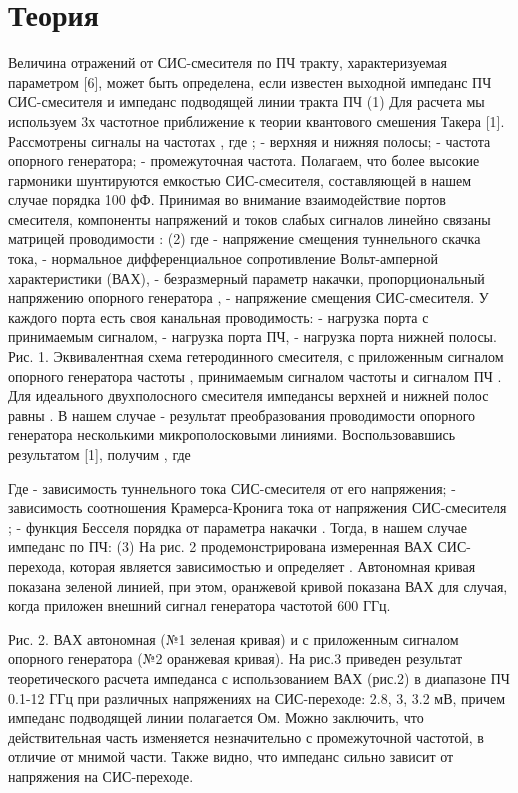 \documentclass[a4paper]{article}
\begin{document}
\section{Теория}

Величина отражений от СИС-смесителя по ПЧ тракту, характеризуемая параметром  [6], может быть определена, если известен выходной импеданс ПЧ СИС-смесителя  и импеданс подводящей линии тракта ПЧ 	(1)
Для расчета  мы используем 3х частотное приближение к теории квантового смешения Такера [1].  Рассмотрены сигналы на частотах  , где ;  - верхняя и нижняя полосы;  - частота опорного генератора;  - промежуточная частота. Полагаем, что более высокие гармоники шунтируются емкостью СИС-смесителя, составляющей в нашем случае порядка 100 фФ.
Принимая во внимание взаимодействие портов смесителя, компоненты напряжений и токов слабых сигналов линейно связаны матрицей проводимости  :
	(2)
где  - напряжение смещения туннельного скачка тока,  - нормальное дифференциальное сопротивление Вольт-амперной характеристики (ВАХ),  - безразмерный параметр накачки, пропорциональный напряжению опорного генератора  ,  - напряжение смещения СИС-смесителя. 
У каждого порта есть своя канальная проводимость:  - нагрузка порта с принимаемым сигналом,  - нагрузка порта ПЧ,  - нагрузка порта нижней полосы.
Рис. 1. Эквивалентная схема гетеродинного смесителя, с приложенным сигналом опорного генератора частоты , принимаемым сигналом частоты  и сигналом ПЧ  .
Для  идеального двухполосного  смесителя  импедансы верхней и нижней полос равны . В нашем случае  - результат преобразования проводимости  опорного генератора несколькими микрополосковыми линиями.
Воспользовавшись результатом [1], получим  , где


Где  - зависимость туннельного  тока СИС-смесителя от его напряжения;  - зависимость соотношения Крамерса-Кронига тока  от напряжения СИС-смесителя ;  - функция Бесселя порядка  от параметра накачки  .
Тогда, в нашем случае импеданс по ПЧ:
	(3)
На рис. 2 продемонстрирована измеренная ВАХ СИС-перехода, которая является  зависимостью и определяет . Автономная кривая показана зеленой линией, при этом, оранжевой кривой показана ВАХ для случая, когда приложен внешний сигнал генератора частотой 600 ГГц. 

Рис. 2. ВАХ автономная (№1 зеленая кривая) и с приложенным сигналом опорного генератора (№2 оранжевая кривая).
На рис.3 приведен результат теоретического расчета импеданса с использованием ВАХ (рис.2) в диапазоне ПЧ 0.1-12 ГГц при различных напряжениях на СИС-переходе: 2.8, 3, 3.2 мВ, причем импеданс подводящей линии   полагается  Ом. Можно заключить, что действительная часть изменяется незначительно с промежуточной частотой, в отличие от мнимой части. Также видно, что импеданс сильно зависит от напряжения на СИС-переходе.
\end{document}
